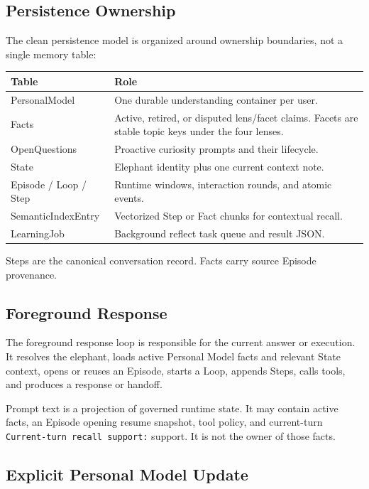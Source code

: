 \subsection{Persistence Ownership}

The clean persistence model is organized around ownership boundaries, not a
single memory table:

\begin{center}
\begin{tabularx}{0.98\linewidth}{@{}lX@{}}
\toprule
\textbf{Table} & \textbf{Role} \\
\midrule
PersonalModel & One durable understanding container per user. \\
Facts & Active, retired, or disputed lens/facet claims. Facets are stable topic keys under the four lenses. \\
OpenQuestions & Proactive curiosity prompts and their lifecycle. \\
State & Elephant identity plus one current context note. \\
Episode / Loop / Step & Runtime windows, interaction rounds, and atomic events. \\
SemanticIndexEntry & Vectorized Step or Fact chunks for contextual recall. \\
LearningJob & Background reflect task queue and result JSON. \\
\bottomrule
\end{tabularx}
\end{center}

Steps are the canonical conversation record. Facts carry source Episode
provenance.

\subsection{Foreground Response}

The foreground response loop is responsible for the current answer or
execution. It resolves the elephant, loads active Personal Model facts and relevant
State context, opens or reuses an Episode, starts a Loop, appends Steps, calls
tools, and produces a response or handoff.

Prompt text is a projection of governed runtime state. It may contain active
facts, an Episode opening resume snapshot, tool policy, and current-turn
\texttt{Current-turn recall support:} support. It is not the owner of those facts.

\subsection{Explicit Personal Model Update}

